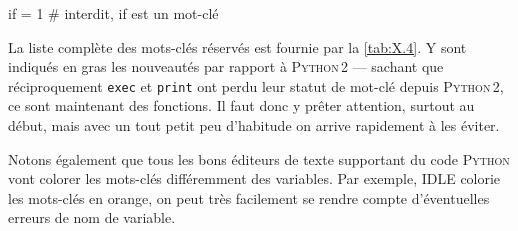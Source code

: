 \begin{nbjupyterin}[before skip=4pt, after skip=0pt]{}
if = 1  # interdit, if est un mot-clé
\end{nbjupyterin}

\pagebreak

La liste complète des mots-clés réservés est fournie par la \cref{tab:X.4}. Y sont indiqués en gras les nouveautés par rapport à \textsc{Python\,2} --- sachant que réciproquement \texttt{exec} et \texttt{print} ont perdu leur statut de mot-clé depuis \textsc{Python\,2}, ce sont maintenant des fonctions.
Il faut donc y prêter attention, surtout au début, mais avec un tout petit peu d'habitude on arrive rapidement à les éviter. 


Notons également que tous les bons éditeurs de texte supportant du code \textsc{Python} vont colorer les mots-clés différemment des variables. Par exemple, IDLE colorie les mots-clés en orange, on peut très facilement se rendre compte d'éventuelles erreurs de nom de variable.

